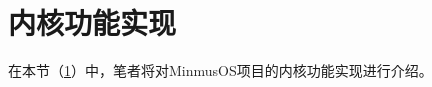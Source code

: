 \section{内核功能实现}\label{sec:KernelFunctionalityImplementation}

在本节（\cref{sec:KernelFunctionalityImplementation}）中，笔者将对MinmusOS项目的内核功能实现进行介绍。